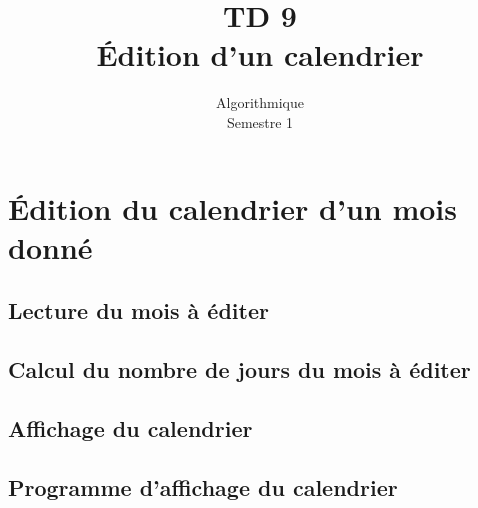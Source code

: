 \documentclass{article}
\title{TD 9\\ Édition d'un calendrier}
\date{Algorithmique\\ Semestre 1}
\begin{document}
	\maketitle
	\section{Édition du calendrier d'un mois donné}
		\subsection{Lecture du mois à éditer}
			
		\subsection{Calcul du nombre de jours du mois à éditer}
			\subsubsection{}
				
			\subsubsection{}
				
		\subsection{Affichage du calendrier}
			\subsubsection{}
				
				
			\subsubsection{}
				
			\subsubsection{}
				
		\subsection{Programme d'affichage du calendrier}
\end{document}
